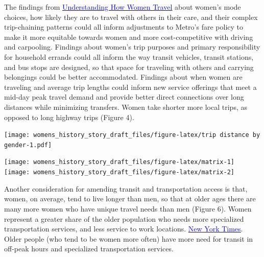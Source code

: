 \documentclass[
  12pt,
]{article}
\begin{document}
\begin{flushleft}
The findings from \href{https://thesource.metro.net/2019/09/19/metro-releases-understanding-how-women-travel-report/}{\underline{\textcolor{blue}{Understanding How Women Travel}}} about women’s mode choices, how likely they are to travel with others in their care, and their complex trip-chaining patterns could all inform adjustments to Metro’s fare policy to make it more equitable towards women and more cost-competitive with driving and carpooling. Findings about women’s trip purposes and primary responsibility for household errands could all inform the way transit vehicles, transit stations, and bus stops are designed, so that space for traveling with others and carrying  belongings could be better accommodated. Findings about when women are traveling and average trip lengths could inform new service offerings that meet a mid-day peak travel demand and provide better direct connections over long distances while minimizing transfers. Women take shorter more local trips, as opposed to long highway trips (Figure 4).
\end{flushleft}

\texttt{[image: womens\_history\_story\_draft\_files/figure-latex/trip distance by gender-1.pdf]}


\texttt{[image: womens\_history\_story\_draft\_files/figure-latex/matrix-1]}
\texttt{[image: womens\_history\_story\_draft\_files/figure-latex/matrix-2]}

\begin{flushleft}
Another consideration for amending transit and transportation access is that, women, on average, tend to live longer than men, so that at older ages there are many more women who have unique travel needs than men (Figure 6). Women represent a greater share of the older population who needs more specialized transportation services, and less service to work locations. \href{https://www.nytimes.com/2022/12/03/health/elderly-living-alone.html}{\underline{\textcolor{blue}{New York Times}}}.  Older people (who tend to be women more often) have more need for transit in off-peak hours and specialized transportation services. 
\end{flushleft}
\end{document}
